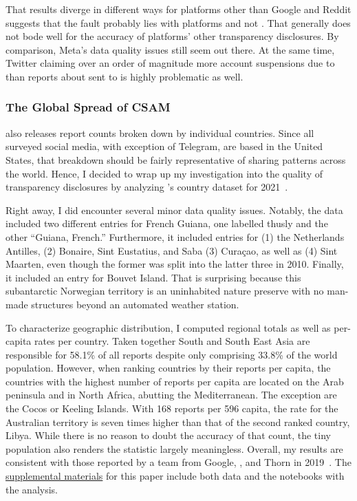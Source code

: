 That results diverge in different ways for platforms other than Google and
Reddit suggests that the fault probably lies with platforms and not . That
generally does not bode well for the accuracy of platforms' other transparency
disclosures. By comparison, Meta's data quality issues still seem out there. At
the same time, Twitter claiming over an order of magnitude more account
suspensions due to  than reports about  sent to  is highly
problematic as well.


\subsubsection{The Global Spread of CSAM}

 also releases report counts broken down by individual countries. Since
all surveyed social media, with exception of Telegram, are based in the United
States, that breakdown should be fairly representative of  sharing
patterns across the world. Hence, I decided to wrap up my investigation into the
quality of transparency disclosures by analyzing 's country dataset for
2021~\cite{NcmecByCountry2021}.

Right away, I did encounter several minor data quality issues. Notably, the data
included two different entries for French Guiana, one labelled thusly and the
other ``Guiana, French.'' Furthermore, it included entries for (1) the
Netherlands Antilles, (2) Bonaire, Sint Eustatius, and Saba (3) Curaçao, as well
as (4) Sint Maarten, even though the former was split into the latter three in
2010. Finally, it included an entry for Bouvet Island. That is surprising
because this subantarctic Norwegian territory is an uninhabited nature preserve
with no man-made structures beyond an automated weather station.

To characterize geographic distribution, I computed regional totals as well as
per-capita rates per country. Taken together South and South East Asia are
responsible for 58.1\% of all reports despite only comprising 33.8\% of the
world population. However, when ranking countries by their reports per capita,
the countries with the highest number of reports per capita are located on the
Arab peninsula and in North Africa, abutting the Mediterranean. The exception are
the Cocos or Keeling Islands. With 168 reports per 596 capita, the rate for the
Australian territory is seven times higher than that of the second ranked
country, Libya. While there is no reason to doubt the accuracy of that count,
the tiny population also renders the statistic largely meaningless. Overall, my
results are consistent with those reported by a team from Google, , and
Thorn in 2019~\cite{BurszteinBrightea2019}. The
\href{https://github.com/apparebit/penal-colony}{supplemental materials} for
this paper include both data and the notebooks with the analysis.


